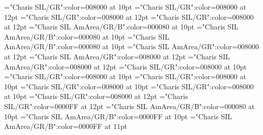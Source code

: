 \documentclass[a4paper,twoside]{article}
\begin{document}
\font{}="Charis SIL/GR":color=008000 at 10pt
\font\examplescontentssensesensecontentsensesentryletDatadicBody="Charis SIL/GR":color=008000 at 12pt
\font\examplescontentexamplescontentssensesensecontentsensesentryletDatadicBody="Charis SIL/GR":color=008000 at 12pt
\font\exampleexamplescontentexamplescontentssensesensecontentsensesentryletDatadicBody="Charis SIL/GR":color=008000 at 12pt
\font\spanmxbexampleexamplescontentexamplescontentssensesensecontentsensesentryletDatadicBody="Charis SIL AmArea/GR/B":color=000080 at 10pt
\font\spanspanmxbexampleexamplescontentexamplescontentssensesensecontentsensesentryletDatadicBody="Charis SIL AmArea/GR/B":color=000080 at 10pt
\font\spanexampleexamplescontentexamplescontentssensesensecontentsensesentryletDatadicBody="Charis SIL AmArea/GR/B":color=000080 at 10pt
\font\translationcontentsexamplescontentexamplescontentssensesensecontentsensesentryletDatadicBody="Charis SIL AmArea/GR":color=008000 at 12pt
\font\translationcontenttranslationcontentsexamplescontentexamplescontentssensesensecontentsensesentryletDatadicBody="Charis SIL AmArea/GR":color=008000 at 12pt
\font\translationtranslationcontenttranslationcontentsexamplescontentexamplescontentssensesensecontentsensesentryletDatadicBody="Charis SIL AmArea/GR":color=008000 at 12pt
\font\spanestranslationtranslationcontenttranslationcontentsexamplescontentexamplescontentssensesensecontentsensesentryletDatadicBody="Charis SIL/GR":color=008000 at 10pt
\font\spanspanestranslationtranslationcontenttranslationcontentsexamplescontentexamplescontentssensesensecontentsensesentryletDatadicBody="Charis SIL/GR":color=008000 at 10pt
\font\spantranslationtranslationcontenttranslationcontentsexamplescontentexamplescontentssensesensecontentsensesentryletDatadicBody="Charis SIL/GR":color=008000 at 10pt
\font\spanesspanestranslationtranslationcontenttranslationcontentsexamplescontentexamplescontentssensesensecontentsensesentryletDatadicBody="Charis SIL/GR":color=008000 at 10pt
\font\translationstesspanestranslationtranslationcontenttranslationcontentsexamplescontentexamplescontentssensesensecontentsensesentryletDatadicBody="Charis SIL/GR":color=008000 at 10pt
\font\minorentryvariantletDatadicBody="Charis SIL/GR":color=008000 at 12pt
\font\headwordminorentryvariantletDatadicBody="Charis SIL/GR":color=0000FF at 12pt
\font\spanmxbheadwordminorentryvariantletDatadicBody="Charis SIL AmArea/GR/B":color=000080 at 10pt
\font\aspanmxbheadwordminorentryvariantletDatadicBody="Charis SIL AmArea/GR/B":color=0000FF at 10pt
\font\spanheadwordminorentryvariantletDatadicBody="Charis SIL AmArea/GR/B":color=0000FF at 11pt
\end{document}
